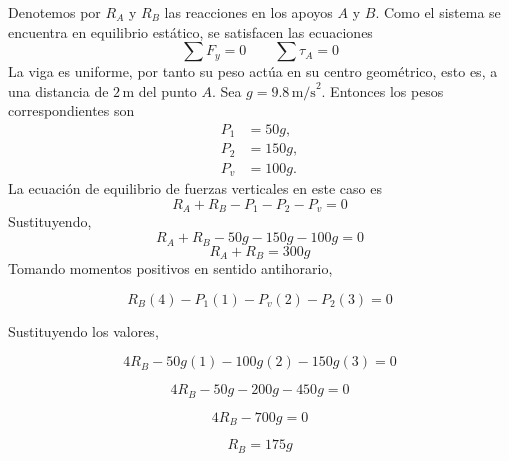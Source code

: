 \documentclass[12pt,a4paper]{article}
\begin{document}
    \begin{solucion}
        Denotemos por $R_A$ y $R_B$ las reacciones en los apoyos $A$ y $B$.
        Como el sistema se encuentra en equilibrio estático, se satisfacen las
        ecuaciones
        \begin{equation*}
            \sum F_y = 0
            \qquad
            \sum \tau_A = 0
        \end{equation*}
        La viga es uniforme, por tanto su peso actúa en su centro geométrico,
        esto es, a una distancia de $2\,\text{m}$ del punto $A$. Sea $g=9.8\,\text{m/s}^2$. Entonces los pesos correspondientes son
        \begin{align*}
            P_1 &= 50g, \\
            P_2 &= 150g, \\
            P_v &= 100g.
        \end{align*}
        La ecuación de equilibrio de fuerzas verticales en este caso es
        \begin{equation*}
            R_A + R_B - P_1 - P_2 - P_v = 0
        \end{equation*}
        Sustituyendo,
        \begin{equation*}
            R_A + R_B - 50g - 150g - 100g = 0
        \end{equation*}
        \begin{equation*}
            R_A + R_B = 300g
        \end{equation*}
        Tomando momentos positivos en sentido antihorario,

        \begin{equation*}
            R_B(4) - P_1(1) - P_v(2) - P_2(3) = 0
        \end{equation*}

        Sustituyendo los valores,

        \begin{equation*}
            4R_B - 50g(1) - 100g(2) - 150g(3) = 0
        \end{equation*}

        \begin{equation*}
            4R_B - 50g - 200g - 450g = 0
        \end{equation*}

        \begin{equation*}
            4R_B - 700g = 0
        \end{equation*}

        \begin{equation*}
            R_B = 175g
        \end{equation*}


\end{solucion}
\end{document}
